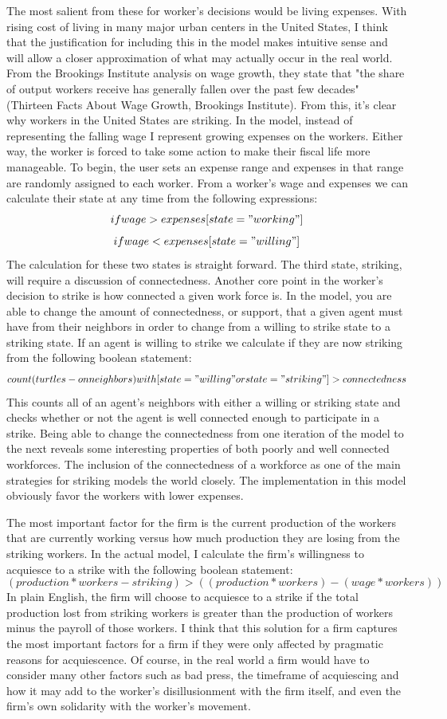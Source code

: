 \documentclass[11pt]{article}
\begin{document}
The most salient from these for worker's decisions would be living expenses. With rising cost of living in many major urban centers in the United States, I think that the justification for including this in the model makes intuitive sense and will allow a closer approximation of what may actually occur in the real world. From the Brookings Institute analysis on wage growth, they state that "the share of output workers receive has generally fallen over the past few decades" (Thirteen Facts About Wage Growth, Brookings Institute). From this, it's clear why workers in the United States are striking. In the model, instead of representing the falling wage I represent growing expenses on the workers. Either way, the worker is forced to take some action to make their fiscal life more manageable.
To begin, the user sets an expense range and expenses in that range are randomly assigned to each worker. From a worker's wage and expenses we can calculate their state at any time from the following expressions:
$$if wage > expenses [state="working"]$$
$$if wage < expenses [state="willing"]$$
The calculation for these two states is straight forward. The third state, striking, will require a discussion of connectedness.
Another core point in the worker's decision to strike is how connected a given work force is. In the model, you are able to change the amount of connectedness, or support, that a given agent must have from their neighbors in order to change from a willing to strike state to a striking state. If an agent is willing to strike we calculate if they are now striking from the following boolean statement:
$$count (turtles-on neighbors) with [ state = "willing" or state = "striking" ] > connectedness$$
This counts all of an agent's neighbors with either a willing or striking state and checks whether or not the agent is well connected enough to participate in a strike. Being able to change the connectedness from one iteration of the model to the next reveals some interesting properties of both poorly and well connected workforces. The inclusion of the connectedness of a workforce as one of the main strategies for striking models the world closely. The implementation in this model obviously favor the workers with lower expenses.

The most important factor for the firm is the current production of the workers that are currently working versus how much production they are losing from the striking workers. In the actual model, I calculate the firm's willingness to acquiesce to a strike with the following boolean statement:
$$(production* workers-striking) > ((production * workers) - (wage * workers))$$ 
In plain English, the firm will choose to acquiesce to a strike if the total production lost from striking workers is greater than the production of workers minus the payroll of those workers. I think that this solution for a firm captures the most important factors for a firm if they were only affected by pragmatic reasons for acquiescence. Of course, in the real world a firm would have to consider many other factors such as bad press, the timeframe of acquiescing and how it may add to the worker's disillusionment with the firm itself, and even the firm's own solidarity with the worker's movement.
\end{document}
